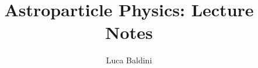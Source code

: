 \documentclass{kaobook}
\author{Luca Baldini}
\title{Astroparticle Physics: Lecture Notes}
\begin{document}
\maketitle




\tableofcontents






\appendix










{}

\end{document}
